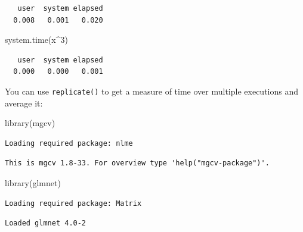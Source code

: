\documentclass[
]{book}
\newenvironment{Shaded}{\begin{snugshade}}{\end{snugshade}}
\newcommand{\DecValTok}[1]{\textcolor[rgb]{0.00,0.00,0.81}{#1}}
\newcommand{\FunctionTok}[1]{\textcolor[rgb]{0.00,0.00,0.00}{#1}}
\newcommand{\NormalTok}[1]{#1}
\newcommand{\SpecialCharTok}[1]{\textcolor[rgb]{0.00,0.00,0.00}{#1}}
\begin{document}
\begin{verbatim}
   user  system elapsed 
  0.008   0.001   0.020 
\end{verbatim}

\begin{Shaded}
\begin{Highlighting}[]
\FunctionTok{system.time}\NormalTok{(x}\SpecialCharTok{\^{}}\DecValTok{3}\NormalTok{)}
\end{Highlighting}
\end{Shaded}

\begin{verbatim}
   user  system elapsed 
  0.000   0.000   0.001 
\end{verbatim}

You can use \texttt{replicate()} to get a measure of time over multiple executions and average it:

\begin{Shaded}
\begin{Highlighting}[]
\FunctionTok{library}\NormalTok{(mgcv)}
\end{Highlighting}
\end{Shaded}

\begin{verbatim}
Loading required package: nlme
\end{verbatim}

\begin{verbatim}
This is mgcv 1.8-33. For overview type 'help("mgcv-package")'.
\end{verbatim}

\begin{Shaded}
\begin{Highlighting}[]
\FunctionTok{library}\NormalTok{(glmnet)}
\end{Highlighting}
\end{Shaded}

\begin{verbatim}
Loading required package: Matrix
\end{verbatim}

\begin{verbatim}
Loaded glmnet 4.0-2
\end{verbatim}
\end{document}
